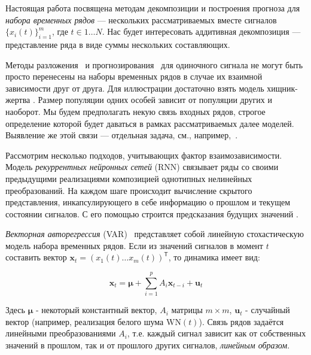 		Настоящая работа посвящена методам декомпозиции и построения прогноза для \textit{набора временных рядов} --- нескольких рассматриваемых вместе сигналов $ \{x_i(t)\}_{i=1}^m $, где $ t \in 1 \ldots N $. Нас будет интересовать аддитивная декомпозиция --- представление ряда в виде суммы нескольких составляющих.
		
		Методы разложения~\cite{enders2010applied, x11, cleveland90} и прогнозирования~\cite{3b1355aedd1041f1853e609a410576f3, enders2010applied, Box_Jenkins_methodology} для одиночного сигнала не могут быть просто перенесены на наборы временных рядов в случае их взаимной зависимости друг от друга. Для иллюстрации достаточно взять модель хищник-жертва \cite{Volterra:1928}. Размер популяции одних особей зависит от популяции других и наоборот. Мы будем предполагать некую связь входных рядов, строгое определение которой будет даваться в рамках рассматриваемых далее моделей. Выявление же этой связи --- отдельная задача, см., например,~\cite{702ab909-8cb1-3c30-a5f1-ab4517d6cf1c, 2012Sci...338..496S}.
		
		Рассмотрим несколько подходов, учитывающих фактор взаимозависимости. Модель \textit{рекуррентных нейронных сетей} (RNN) \cite{neco, TEALAB2018334} связывает ряды со своими предыдущими реализациями композицией однотипных нелинейных преобразований. На каждом шаге происходит вычисление скрытого представления, инкапсулирующего в себе информацию о прошлом и текущем состоянии сигналов. С его помощью строится предсказания будущих значений \cite{ZHANG2023143, HEWAMALAGE2021388}. 
		
		\textit{Векторная авторегрессия} (VAR)~\cite{VAR_model1, doi:10.1080/01621459.1962.10480664} представляет собой линейную стохастическую модель набора временных рядов. Если из значений сигналов в момент $ t $ составить вектор $ \mathbf{x}_t = (x_1(t) \ldots x_m(t))^{\mathsf{T}} $, то динамика имеет вид:
		
		\begin{equation*}
			\mathbf{x}_t = \boldsymbol{\mu} + \sum\limits_{i = 1}^p A_i \mathbf{x}_{t - i} + \mathbf{u}_t
		\end{equation*}
		
		Здесь $ \boldsymbol{\mu} $ - некоторый константный вектор, $ A_i $ матрицы $ m \times m $, $ \mathbf{u}_t $ - случайный вектор (например, реализация белого шума $ \text{WN}(t) $). Связь рядов задаётся линейными преобразованиями $ A_i $, т.е. каждый сигнал зависит как от собственных значений в прошлом, так и от прошлого других сигналов, \textit{линейным образом}. 	
		
